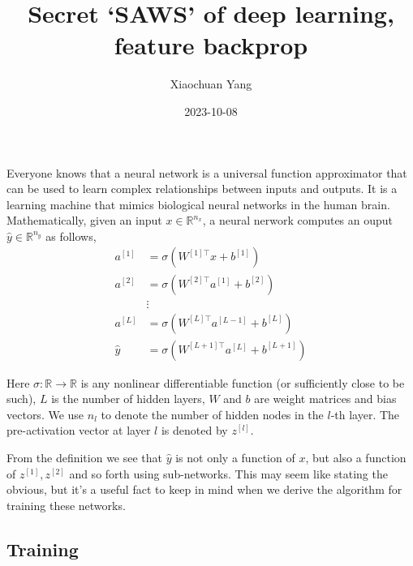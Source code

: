 \documentclass[
  letterpaper,
  DIV=11,
  numbers=noendperiod]{scrartcl}
\title{Secret `SAWS' of deep learning, feature backprop}
\author{Xiaochuan Yang}
\date{2023-10-08}
\begin{document}
\maketitle
\ifdefined\Shaded\renewenvironment{Shaded}{\begin{tcolorbox}[interior hidden, enhanced, borderline west={3pt}{0pt}{shadecolor}, boxrule=0pt, sharp corners, breakable, frame hidden]}{\end{tcolorbox}}\fi

\usepackage{minted}
\usepackage{amsmath,amsfonts,amssymb,amsthm,mathrsfs,mathtools,bbm}
\def\RR{\mathbb{R}}
\def\ZZ{\mathbb{Z}}
\def\NN{\mathbb{N}}
\def\QQ{\mathbb{Q}}
\def\PP{\mathbb{P}}
\def\XX{\mathbb{X}}
\def\EE{\mathbb{E}}
\def\Var{\mathbb{V}\mathrm{ar}}
\def\Cov{\mathbb{C}\mathrm{ov}}
\def\Corr{\mathbb{C}\mathrm{orr}}
\def\Ent{\mathbb{E}\mathrm{nt}}
\def\1{\mathbbm{1}}

Everyone knows that a neural network is a universal function
approximator that can be used to learn complex relationships between
inputs and outputs. It is a learning machine that mimics biological
neural networks in the human brain. Mathematically, given an input
\(x\in\mathbb{R}^{n_x}\), a neural nerwork computes an ouput
\(\hat y\in\mathbb{R}^{n_y}\) as follows, \begin{align*}
a^{[1]} &= \sigma(W^{[1]\top} x + b^{[1]}) \\
a^{[2]} &= \sigma(W^{[2]\top} a^{[1]} + b^{[2]}) \\
&\vdots \\
a^{[L]} &= \sigma(W^{[L]\top} a^{[L-1]} + b^{[L]}) \\
\hat y &= \sigma(W^{[L+1]\top} a^{[L]} + b^{[L+1]})
\end{align*}

Here \(\sigma:\mathbb{R}\to\mathbb{R}\) is any nonlinear differentiable
function (or sufficiently close to be such), \(L\) is the number of
hidden layers, \(W\) and \(b\) are weight matrices and bias vectors. We
use \(n_l\) to denote the number of hidden nodes in the \(l\)-th layer.
The pre-activation vector at layer \(l\) is denoted by \(z^{[l]}\).

From the definition we see that \(\hat y\) is not only a function of
\(x\), but also a function of \(z^{[1]}, z^{[2]}\) and so forth using
sub-networks. This may seem like stating the obvious, but it's a useful
fact to keep in mind when we derive the algorithm for training these
networks.

\hypertarget{sec-training}{%
\subsection{Training}\label{sec-training}}
\end{document}
